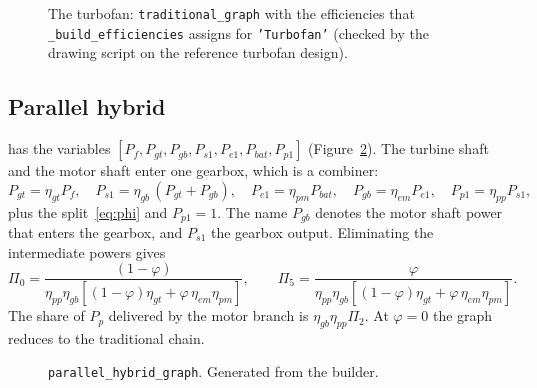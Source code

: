 \documentclass[a4paper,11pt]{article}
\begin{document}
\begin{figure}[htbp]
\centering

\caption{The turbofan: \texttt{traditional\_graph} with the efficiencies that
\texttt{\_build\_efficiencies} assigns for \texttt{'Turbofan'} (checked by the drawing script on the
reference turbofan design).}\label{fig:g-tf}
\end{figure}

\subsection{Parallel hybrid}\label{sec:parallel}
 has
the variables $[P_f, P_{gt}, P_{gb}, P_{s1}, P_{e1}, P_{bat}, P_{p1}]$
(Figure~\ref{fig:g-par}). The turbine shaft and the motor shaft enter one gearbox, which is a
combiner:
\begin{equation}
  P_{gt} = \eta_{gt}P_f,\quad
  P_{s1} = \eta_{gb}\,(P_{gt} + P_{gb}),\quad
  P_{e1} = \eta_{pm}P_{bat},\quad
  P_{gb} = \eta_{em}P_{e1},\quad
  P_{p1} = \eta_{pp}P_{s1},
\end{equation}
plus the split~\eqref{eq:phi} and $P_{p1} = 1$. The name $P_{gb}$ denotes the motor shaft
power that enters the gearbox, and $P_{s1}$ the gearbox output. Eliminating the
intermediate powers gives
\begin{equation}
  \Pi_0 = \frac{(1-\varphi)}{\eta_{pp}\eta_{gb}\left[(1-\varphi)\eta_{gt} + \varphi\,\eta_{em}\eta_{pm}\right]},\qquad
  \Pi_5 = \frac{\varphi}{\eta_{pp}\eta_{gb}\left[(1-\varphi)\eta_{gt} + \varphi\,\eta_{em}\eta_{pm}\right]} .
  \label{eq:par}
\end{equation}
The share of $P_p$ delivered by the motor branch is $\eta_{gb}\eta_{pp}\Pi_2$. At
$\varphi = 0$ the graph reduces to the traditional chain.

\begin{figure}[htbp]
\centering

\caption{\texttt{parallel\_hybrid\_graph}. Generated from the builder.}\label{fig:g-par}
\end{figure}
\end{document}
